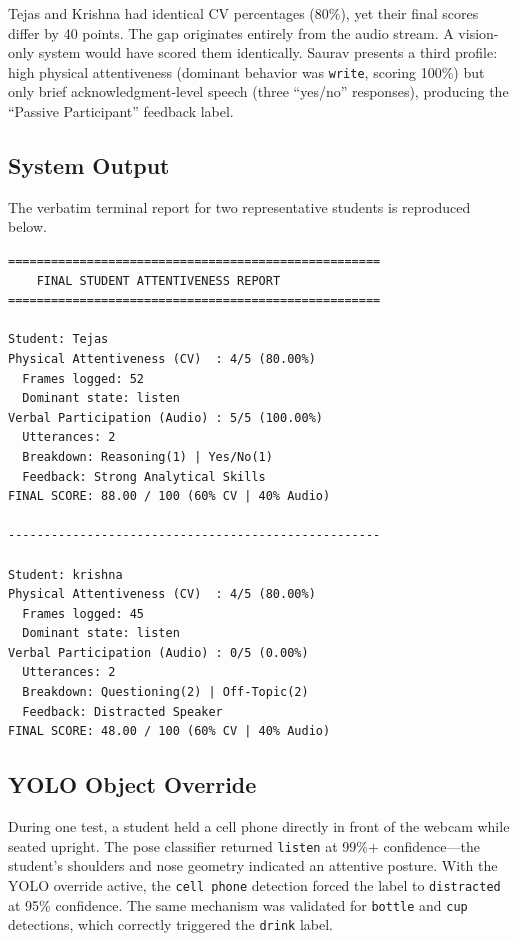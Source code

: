 \documentclass[conference]{IEEEtran}
\begin{document}
Tejas and Krishna had identical CV percentages (80\%), yet their final scores differ by 40 points. The gap originates entirely from the audio stream. A vision-only system would have scored them identically. Saurav presents a third profile: high physical attentiveness (dominant behavior was \texttt{write}, scoring 100\%) but only brief acknowledgment-level speech (three ``yes/no'' responses), producing the ``Passive Participant'' feedback label.

\subsection{System Output}
The verbatim terminal report for two representative students is reproduced below.

\begin{verbatim}
====================================================
    FINAL STUDENT ATTENTIVENESS REPORT
====================================================

Student: Tejas
Physical Attentiveness (CV)  : 4/5 (80.00%)
  Frames logged: 52
  Dominant state: listen
Verbal Participation (Audio) : 5/5 (100.00%)
  Utterances: 2
  Breakdown: Reasoning(1) | Yes/No(1)
  Feedback: Strong Analytical Skills
FINAL SCORE: 88.00 / 100 (60% CV | 40% Audio)

----------------------------------------------------

Student: krishna
Physical Attentiveness (CV)  : 4/5 (80.00%)
  Frames logged: 45
  Dominant state: listen
Verbal Participation (Audio) : 0/5 (0.00%)
  Utterances: 2
  Breakdown: Questioning(2) | Off-Topic(2)
  Feedback: Distracted Speaker
FINAL SCORE: 48.00 / 100 (60% CV | 40% Audio)
\end{verbatim}

\subsection{YOLO Object Override}
During one test, a student held a cell phone directly in front of the webcam while seated upright. The pose classifier returned \texttt{listen} at 99\%+ confidence---the student's shoulders and nose geometry indicated an attentive posture. With the YOLO override active, the \texttt{cell phone} detection forced the label to \texttt{distracted} at 95\% confidence. The same mechanism was validated for \texttt{bottle} and \texttt{cup} detections, which correctly triggered the \texttt{drink} label.
\end{document}
